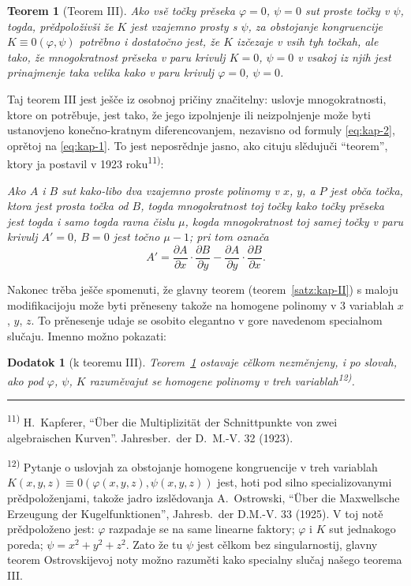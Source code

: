 \documentclass[11pt]{article}
\newcommand{\foreign}[1]{#1}
\theoremstyle{plain}
\newtheorem{satz}{Teorem}
\newtheorem{zusatz}{Dodatok}
\begin{document}
\begin{satz}[Teorem III]\label{satz:kap-III}
Ako vsě točky prěseka $\varphi = 0$, $\psi = 0$ sut proste točky v
$\psi$, togda, prědpoloživši že $K$ jest vzajemno prosty s $\psi$,
za obstojanje kongruencije $K \equiv 0(\varphi, \psi)$ potrěbno i
dostatočno jest, že $K$ izčezaje v vsih tyh točkah, ale tako, že
mnogokratnost prěseka v paru krivulj $K = 0$, $\psi = 0$ v vsakoj
iz njih jest prinajmenje taka velika kako v paru krivulj
$\varphi = 0$, $\psi = 0$.
\end{satz}

Taj teorem III jest ješče iz osobnoj pričiny značitelny: uslovje
mnogokratnosti, ktore on potrěbuje, jest tako, že jego izpolnjenje
ili neizpolnjenje može byti ustanovjeno konečno-kratnym
diferencovanjem, nezavisno od formuly \eqref{eq:kap-2}, oprětoj na
\eqref{eq:kap-1}. To jest neposrědnje jasno, ako cituju slědujuči
``teorem'', ktory ja postavil v 1923 roku\textsuperscript{11)}:

\smallskip
\textit{Ako $A$ i $B$ sut kako-libo dva vzajemno proste polinomy v
$x$, $y$, a $P$ jest obča točka, ktora jest prosta točka od $B$,
togda mnogokratnost toj točky kako točky prěseka jest togda i samo
togda ravna čislu $\mu$, kogda mnogokratnost toj samej točky v paru
krivulj $A' = 0$, $B = 0$ jest točno $\mu - 1$; pri tom označa}
\[
A' = \frac{\partial A}{\partial x} \cdot \frac{\partial B}{\partial y} -
\frac{\partial A}{\partial y} \cdot \frac{\partial B}{\partial x}.
\]

Nakonec trěba ješče spomenuti, že glavny teorem
(teorem~\ref{satz:kap-II}) s maloju modifikacijoju može byti
prěneseny takože na homogene polinomy v 3 variablah $x$, $y$, $z$.
To prěnesenje udaje se osobito elegantno v gore navedenom specialnom
slučaju. Imenno možno pokazati:

\begin{zusatz}[k teoremu III]
Teorem~\ref{satz:kap-III} ostavaje cělkom nezměnjeny, i po slovah,
ako pod $\varphi$, $\psi$, $K$ razuměvajut se homogene polinomy v
treh variablah\textsuperscript{12)}.
\end{zusatz}

\vspace{0.5em}
\noindent\rule{\textwidth}{0.4pt}
\vspace{0.3em}

{\footnotesize
\textsuperscript{11)} H.\ Kapferer, ``\foreign{Über die Multiplizität der Schnittpunkte von zwei algebraischen
Kurven}''. \foreign{Jahresber.\ der D.\ M.-V.} 32 (1923).

\textsuperscript{12)} Pytanje o uslovjah za obstojanje homogene kongruencije v
treh variablah $K(x,y,z) \equiv 0(\varphi(x,y,z), \psi(x,y,z))$ jest,
hoti pod silno specializovanymi prědpoloženjami, takože jadro
izslědovanja \foreign{A.\ Ostrowski}, ``\foreign{Über die Maxwellsche Erzeugung der
Kugelfunktionen}'', \foreign{Jahresb.\ der D.M.-V.} 33 (1925). V toj
notě prědpoloženo jest: $\varphi$ razpadaje se na same linearne
faktory; $\varphi$ i $K$ sut jednakogo poreda; $\psi = x^{2} + y^{2} + z^{2}$.
Zato že tu $\psi$ jest cělkom bez singularnostij, glavny teorem
Ostrovskijevoj noty možno razuměti kako specialny slučaj našego
teorema III.
}
\end{document}
